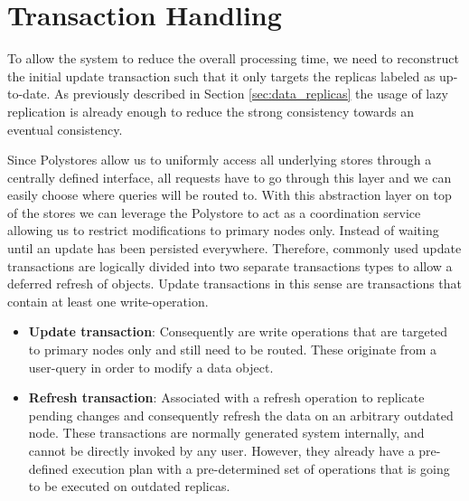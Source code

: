 
\section{Transaction Handling}
\label{sec:tx_handling}

To allow the system to reduce the overall processing time, we need to reconstruct the initial update transaction such that it only 
targets the replicas labeled as up-to-date. As previously described in Section \ref{sec:data_replicas} the usage of lazy replication is already enough to reduce the strong
consistency towards an eventual consistency.

Since Polystores allow us to uniformly access all underlying stores through a centrally defined interface, 
all requests have to go through this layer and we can easily choose where queries will be routed to. 
With this abstraction layer on top of the stores we can leverage the Polystore to act as a coordination service allowing us to restrict modifications to primary nodes only. 
Instead of waiting until an update has been persisted everywhere.
Therefore, commonly used update transactions are logically divided into two separate transactions types to allow a deferred refresh of objects.
Update transactions in this sense are transactions that contain at least one write-operation.
\begin{itemize}
    \item \textbf{Update transaction}:  Consequently are write operations that are targeted to primary nodes only and still need to be routed. 
                                        These originate from a user-query in order to modify a data object.

    \item \textbf{Refresh transaction}: Associated with a refresh operation to replicate pending changes and consequently refresh the data on an arbitrary outdated node.
                                        These transactions are normally generated system internally, and cannot be directly invoked by any user. 
                                        However, they already have a pre-defined execution plan with a pre-determined set of operations that is going to be executed on outdated replicas.               
\end{itemize}


